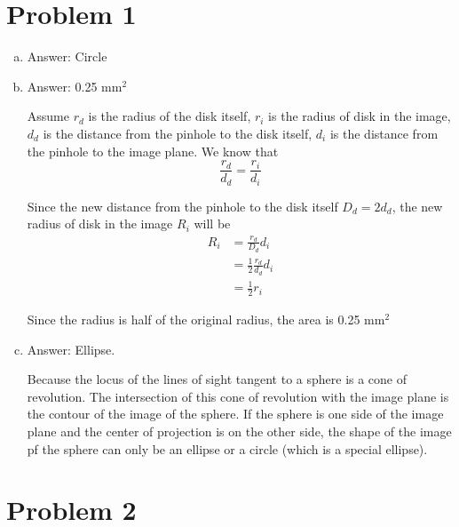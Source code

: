 \documentclass{homework}
\date{September 18, 2019} %
\begin{document}
\maketitle
\setlength{\parindent}{0pt}

\section{Problem 1}
\begin{enumerate}[a)]
	\item Answer: Circle
	
	\item Answer: 0.25 mm$^2$
	
	Assume $r_{d}$ is the radius of the disk itself, $r_{i}$ is the radius of disk in the image, $d_{d}$ is the distance from the pinhole to the disk itself, $d_{i}$ is the distance from the pinhole to the image plane. We know that
$$
\frac{r_{d}}{d_{d}} = \frac{r_i}{d_i}$$

	Since the new distance from the pinhole to the disk itself $D_d = 2d_d$, the new radius of disk in the image $R_i$ will be 
\begin{align*}
R_i &= \frac{r_d}{D_d}d_i  \\
&= \frac{1}{2} \frac{r_d}{d_d}d_i \\
&= \frac{1}{2}r_i
\end{align*}

	Since the radius is half of the original radius, the area is 0.25 mm$^2$

	\item Answer: Ellipse. 
	
	Because the locus of the lines of sight
tangent to a sphere is a cone of revolution. The intersection of this cone of revolution with the image plane is the contour of the image of the sphere. If the sphere is one side of the image plane and the center of projection is on
the other side, the shape of the image pf the sphere can only be an ellipse or a circle (which is a special ellipse).

\end{enumerate}


\section{Problem 2}
\end{document}
